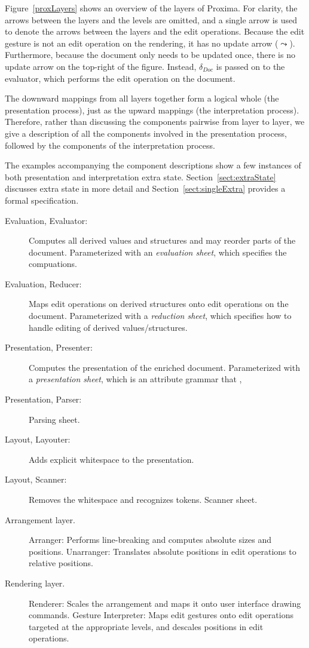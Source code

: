 Figure~\ref{proxLayers} shows an overview of the layers of Proxima. For clarity, the arrows between the layers and the levels are omitted, and a single arrow is used to denote the arrows between the layers and the edit operations. Because the edit gesture is not an edit operation on the rendering, it has no update arrow ($\leadsto$). Furthermore, because the document only needs to be updated once, there is no update arrow on the top-right of the figure. Instead, $\delta_{Doc}$ is passed on to the evaluator, which performs the edit operation on the document.

The downward mappings from all layers together form a logical whole (the presentation process), just as the upward mappings (the interpretation process). Therefore, rather than discussing the components pairwise from layer to layer, we give a description of all the components involved in the presentation process, followed by the components of the interpretation process. 

The examples accompanying the component descriptions show a few instances of both presentation and interpretation extra state. Section~\ref{sect:extraState} discusses extra state in more detail and Section~\ref{sect:singleExtra} provides a formal specification. 

\bc
\begin{description}
\item [Evaluation, Evaluator:] Computes all derived values and structures and may reorder parts of the document. Parameterized with an {\em evaluation sheet}, which specifies the compuations.
\item [Evaluation, Reducer:] Maps edit operations on derived structures onto edit operations on the document. Parameterized with a {\em reduction sheet}, which specifies how to handle editing of derived values/structures.
\item [Presentation, Presenter:] Computes the presentation of the enriched document. Parameterized with a {\em presentation sheet}, which is an attribute grammar that , 
\item [Presentation, Parser:] Parsing sheet.
\item [Layout, Layouter:] Adds explicit whitespace to the presentation.
\item [Layout, Scanner:] Removes the whitespace and recognizes tokens. Scanner sheet.
\item [Arrangement layer.]
Arranger: Performs line-breaking and computes absolute sizes and positions.
Unarranger: Translates absolute positions in edit operations to relative positions.
\item [Rendering layer.]
Renderer: Scales the arrangement and maps it onto user interface drawing commands.
Gesture Interpreter: Maps edit gestures onto edit operations targeted at the appropriate levels, and descales positions in edit operations.
\end{description}
\ec


